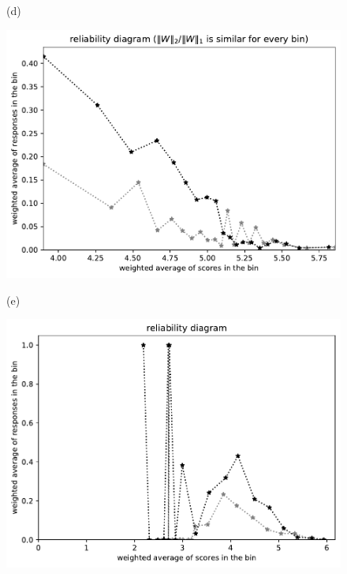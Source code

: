 \documentclass{article}
\newlength{\vertsep}
\newlength{\imsize}
\begin{document}
\begin{figure}
\begin{centering}
(d)
\parbox{\imsize}{\includegraphics[width=\imsize]
{../codes/weighted/County_of_San_Francisco_vs_Contra_Costa-LNGI/equierrs20.pdf}}
\quad\quad
(e)
\parbox{\imsize}{\includegraphics[width=\imsize]
{../codes/weighted/County_of_San_Francisco_vs_Contra_Costa-LNGI/equiscores20.pdf}}

\vspace{\vertsep}


\end{centering}
\end{figure}
\end{document}
